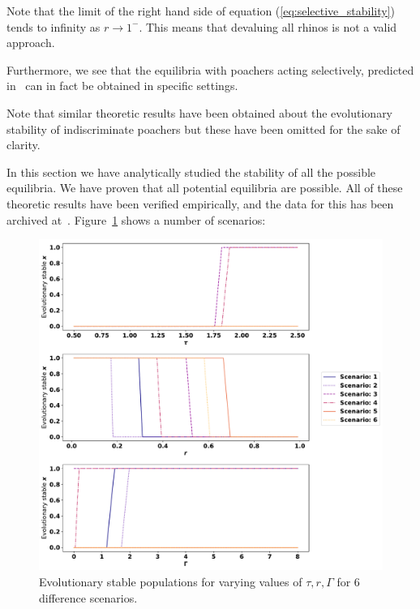 \documentclass[10pt]{article}
\begin{document}
Note that the limit of the right hand side of equation (\ref{eq:selective_stability})
tends to infinity as \(r\to1^-\). This means that devaluing all rhinos is not
a valid approach.

Furthermore, we see that the equilibria with poachers acting selectively,
predicted in~\cite{Lee} can in fact be obtained in specific settings.

Note that similar theoretic results have been obtained about the evolutionary
stability of indiscriminate poachers but these have been omitted for the sake of
clarity.

In this section we have analytically studied the stability of all the possible
equilibria. We have proven that all potential equilibria are possible.  All of
these theoretic results have been verified empirically, and the data for this
has been archived at~\cite{Glynatsi2017}.
Figure~\ref{fig:convergence-over-r} shows a number of scenarios:

\begin{itemize}
    
\end{itemize}

\begin{figure}[!htbp]
    \includegraphics[width=\textwidth]{images/steady_populations.pdf}
    \caption{Evolutionary stable populations for varying values of \(\tau, r,
    \Gamma\) for 6 difference scenarios.}
    \label{fig:convergence-over-r}
\end{figure}
\end{document}
